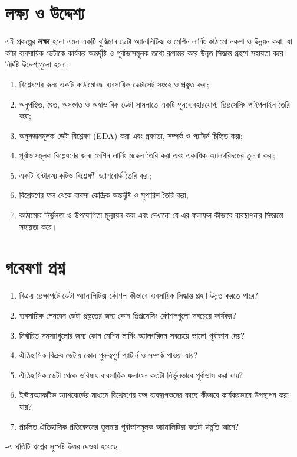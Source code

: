 \section{লক্ষ্য ও উদ্দেশ্য}
এই প্রকল্পের \textbf{লক্ষ্য} হলো এমন একটি বুদ্ধিমান ডেটা অ্যানালিটিক্স ও মেশিন লার্নিং কাঠামো নকশা ও উন্নয়ন করা, যা কাঁচা
ব্যবসায়িক ডেটাকে কার্যকর অন্তর্দৃষ্টি ও পূর্বাভাসমূলক তথ্যে রূপান্তর করে উন্নত সিদ্ধান্ত গ্রহণে সহায়তা করে। নির্দিষ্ট উদ্দেশ্যগুলো হলো:
\begin{enumerate}[label=O\arabic*.]
  \item বিশ্লেষণের জন্য একটি কাঠামোবদ্ধ ব্যবসায়িক ডেটাসেট সংগ্রহ ও প্রস্তুত করা;
  \item অনুপস্থিত, দ্বৈত, অসংগত ও অস্বাভাবিক ডেটা সামলাতে একটি পুনঃব্যবহারযোগ্য প্রিপ্রসেসিং পাইপলাইন তৈরি করা;
  \item অনুসন্ধানমূলক ডেটা বিশ্লেষণ (EDA) করা এবং প্রবণতা, সম্পর্ক ও প্যাটার্ন চিহ্নিত করা;
  \item পূর্বাভাসমূলক বিশ্লেষণের জন্য মেশিন লার্নিং মডেল তৈরি করা এবং একাধিক অ্যালগরিদমের তুলনা করা;
  \item একটি ইন্টারঅ্যাকটিভ বিশ্লেষণী ড্যাশবোর্ড তৈরি করা;
  \item বিশ্লেষণের ফল থেকে ব্যবসা-কেন্দ্রিক অন্তর্দৃষ্টি ও সুপারিশ তৈরি করা;
  \item কাঠামোর নির্ভুলতা ও উপযোগিতা মূল্যায়ন করা এবং দেখানো যে এর ফলাফল কীভাবে ব্যবস্থাপনার সিদ্ধান্তে সহায়তা করে।
\end{enumerate}

\section{গবেষণা প্রশ্ন}
\begin{enumerate}[label=RQ\arabic*.]
  \item বিক্রয় প্রেক্ষাপটে ডেটা অ্যানালিটিক্স কৌশল কীভাবে ব্যবসায়িক সিদ্ধান্ত গ্রহণ উন্নত করতে পারে?
  \item ব্যবসায়িক লেনদেন ডেটা প্রস্তুতের জন্য কোন প্রিপ্রসেসিং কৌশলগুলো সবচেয়ে কার্যকর?
  \item নির্বাচিত সমস্যাগুলোর জন্য কোন মেশিন লার্নিং অ্যালগরিদম সবচেয়ে ভালো পূর্বাভাস দেয়?
  \item ঐতিহাসিক বিক্রয় ডেটায় কোন গুরুত্বপূর্ণ প্যাটার্ন ও সম্পর্ক পাওয়া যায়?
  \item ঐতিহাসিক ডেটা থেকে ভবিষ্যৎ ব্যবসায়িক ফলাফল কতটা নির্ভুলভাবে পূর্বাভাস করা যায়?
  \item ইন্টারঅ্যাকটিভ ড্যাশবোর্ডের মাধ্যমে বিশ্লেষণের ফল ব্যবস্থাপকদের কাছে কীভাবে কার্যকরভাবে উপস্থাপন করা যায়?
  \item প্রচলিত ঐতিহাসিক প্রতিবেদনের তুলনায় পূর্বাভাসমূলক অ্যানালিটিক্স কতটা উন্নতি আনে?
\end{enumerate}
-এ প্রতিটি প্রশ্নের সুস্পষ্ট উত্তর দেওয়া হয়েছে।

